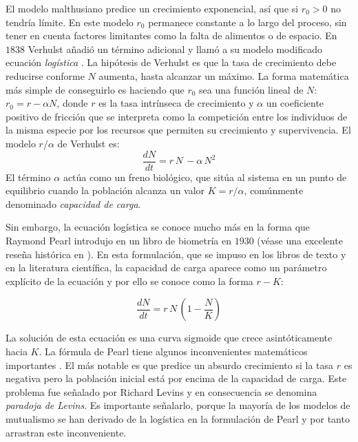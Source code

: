 El modelo malthusiano predice un crecimiento exponencial, así que si $r_0 > 0$ no tendría límite. En este modelo $r_0$ permanece constante a lo largo del proceso, sin tener en cuenta factores limitantes como la falta de alimentos o de espacio. En $1838$ Verhulst añadió un término adicional y llamó a su modelo modificado ecuación \emph{logística} \cite{verhulst1845}. La hipótesis de Verhulst es que la tasa de crecimiento debe reducirse conforme $N$ aumenta, hasta alcanzar un máximo. La forma matemática más simple de conseguirlo es haciendo que $r_0$ sea una función lineal de $N$: $ r_0 = r - \alpha N$, donde $r$ es la tasa intrínseca de crecimiento y $\alpha$ un coeficiente positivo de fricción que se interpreta como la competición entre los individuos de la misma especie por los recursos que permiten su crecimiento y supervivencia. El modelo $r/\alpha$ de Verhulst es:
\begin{equation}
\frac{dN}{dt}=r \, N \,  - \alpha  \, N^2 
\label{eq:primitiveverhulst}
\end{equation}
El término $\alpha$ actúa como un freno biológico, que sitúa al sistema en un punto de equilibrio cuando la población alcanza un valor $ K = r / \alpha$, comúnmente denominado \emph{capacidad de carga}.

Sin embargo, la ecuación logística se conoce mucho más en la forma que Raymond Pearl introdujo en un libro de biometría en $1930$ (véase una excelente reseña histórica en \cite{mallet2012struggle}). En esta formulación, que se impuso en los libros de texto y en la literatura científica, la capacidad de carga aparece como un parámetro explícito de la ecuación y por ello se conoce como la forma $r-K$:

\begin{equation}
\frac{dN}{dt}=r \, N \, \left(1-\frac{N}{K}\right)
\label{pearl}
\end{equation}

La solución de esta ecuación es una curva sigmoide que crece asintóticamente hacia $K$. La fórmula de Pearl tiene algunos inconvenientes matemáticos importantes \citep{kuno1991some,gabriel2005paradoxes}. El más notable es que predice un absurdo crecimiento si la tasa $r$ es negativa pero la población inicial está por encima de la capacidad de carga. Este problema fue señalado por Richard Levins y en consecuencia se denomina \textit{paradoja de Levins}. Es importante señalarlo, porque la mayoría de los modelos de mutualismo se han derivado de la logística en la formulación de Pearl y por tanto arrastran este inconveniente.

